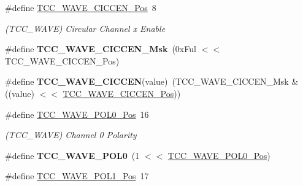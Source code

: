 \begin{DoxyCompactItemize}
\item 
\hypertarget{group___s_a_m_l21___t_c_c_gaff118ddf2e400205aa833129e667fce3}{}\#define \hyperlink{group___s_a_m_l21___t_c_c_gaff118ddf2e400205aa833129e667fce3}{T\+C\+C\+\_\+\+W\+A\+V\+E\+\_\+\+C\+I\+C\+C\+E\+N\+\_\+\+Pos}~8\label{group___s_a_m_l21___t_c_c_gaff118ddf2e400205aa833129e667fce3}

\begin{DoxyCompactList}\small\item\em (T\+C\+C\+\_\+\+W\+A\+V\+E) Circular Channel x Enable \end{DoxyCompactList}\item 
\hypertarget{group___s_a_m_l21___t_c_c_ga9184ee1012c67d776197945cf477346c}{}\#define {\bfseries T\+C\+C\+\_\+\+W\+A\+V\+E\+\_\+\+C\+I\+C\+C\+E\+N\+\_\+\+Msk}~(0x\+Ful $<$$<$ T\+C\+C\+\_\+\+W\+A\+V\+E\+\_\+\+C\+I\+C\+C\+E\+N\+\_\+\+Pos)\label{group___s_a_m_l21___t_c_c_ga9184ee1012c67d776197945cf477346c}

\item 
\hypertarget{group___s_a_m_l21___t_c_c_ga883f8be939821627eed090c36c28b625}{}\#define {\bfseries T\+C\+C\+\_\+\+W\+A\+V\+E\+\_\+\+C\+I\+C\+C\+E\+N}(value)~(T\+C\+C\+\_\+\+W\+A\+V\+E\+\_\+\+C\+I\+C\+C\+E\+N\+\_\+\+Msk \& ((value) $<$$<$ \hyperlink{group___s_a_m_l21___t_c_c_gaff118ddf2e400205aa833129e667fce3}{T\+C\+C\+\_\+\+W\+A\+V\+E\+\_\+\+C\+I\+C\+C\+E\+N\+\_\+\+Pos}))\label{group___s_a_m_l21___t_c_c_ga883f8be939821627eed090c36c28b625}

\item 
\hypertarget{group___s_a_m_l21___t_c_c_ga62cd0fa73e95a14faf5789991aebdda3}{}\#define \hyperlink{group___s_a_m_l21___t_c_c_ga62cd0fa73e95a14faf5789991aebdda3}{T\+C\+C\+\_\+\+W\+A\+V\+E\+\_\+\+P\+O\+L0\+\_\+\+Pos}~16\label{group___s_a_m_l21___t_c_c_ga62cd0fa73e95a14faf5789991aebdda3}

\begin{DoxyCompactList}\small\item\em (T\+C\+C\+\_\+\+W\+A\+V\+E) Channel 0 Polarity \end{DoxyCompactList}\item 
\hypertarget{group___s_a_m_l21___t_c_c_ga2d51cf9f70ceec06431ac24305da8560}{}\#define {\bfseries T\+C\+C\+\_\+\+W\+A\+V\+E\+\_\+\+P\+O\+L0}~(1 $<$$<$ \hyperlink{group___s_a_m_l21___t_c_c_ga62cd0fa73e95a14faf5789991aebdda3}{T\+C\+C\+\_\+\+W\+A\+V\+E\+\_\+\+P\+O\+L0\+\_\+\+Pos})\label{group___s_a_m_l21___t_c_c_ga2d51cf9f70ceec06431ac24305da8560}

\item 
\hypertarget{group___s_a_m_l21___t_c_c_ga832bcc3f5775bc3f720ad9d15fbab73e}{}\#define \hyperlink{group___s_a_m_l21___t_c_c_ga832bcc3f5775bc3f720ad9d15fbab73e}{T\+C\+C\+\_\+\+W\+A\+V\+E\+\_\+\+P\+O\+L1\+\_\+\+Pos}~17\label{group___s_a_m_l21___t_c_c_ga832bcc3f5775bc3f720ad9d15fbab73e}


\end{DoxyCompactItemize}

